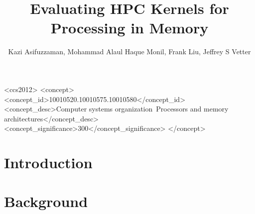 \documentclass[format=sigconf, review=false, anonymous=false]{acmart}
\begin{document}
\title{Evaluating HPC Kernels for Processing in Memory}

\author{Kazi Asifuzzaman, Mohammad Alaul Haque Monil, Frank Liu, Jeffrey S Vetter}







\renewcommand{\shortauthors}{}

\begin{CCSXML}

<ccs2012>
<concept>
<concept_id>10010520.10010575.10010580</concept_id>
<concept_desc>Computer systems organization~Processors and memory architectures</concept_desc>
<concept_significance>300</concept_significance>
</concept>
\end{CCSXML}



\begin{abstract}
	 
\end{abstract}







\maketitle
\thispagestyle{empty}

\section{Introduction}
  

\section{Background}
  
\end{document}
